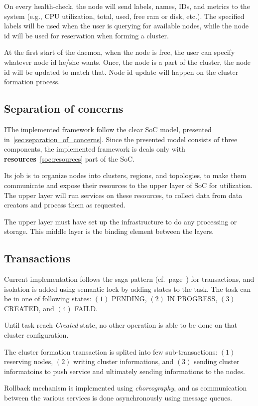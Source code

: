 On every health-check, the node will send labels, names, IDs, and metrics to the system (e.g., CPU utilization, total, used, free ram or disk, etc.). The specified labels will be used when the user is querying for available nodes, while the node id will be used for reservation when forming a cluster.

At the first start of the daemon, when the node is free, the user can specify whatever node id he/she wants. Once, the node is a part of the cluster, the node id will be updated to match that. Node id update will happen on the cluster formation process.
%
%
\subsection{Separation of concerns}\label{sec:framework_SoC}
%
IThe implemented framework follow the clear SoC model, presented in~\ref{sec:separation_of_concerns}. Since the presented model consists of three components, the implemented framework is deals only with \textbf{resources}~\ref{soc:resources} part of the SoC. 

Its job is to organize nodes into clusters, regions, and topologies, to make them communicate and expose their resources to the upper layer of SoC for utilization. The upper layer will run services on these resources, to collect data from data creators and process them as requested.

The upper layer must have set up the infrastructure to do any processing or storage. This middle layer is the binding element between the layers.
%
%
\subsection{Transactions}\label{sec:transaction}
%
Current implementation follows the saga pattern (cf.~page~\pageref{sec:sagas}) for transactions, and isolation is added using semantic lock by adding states to the task. The task can be in one of following states: $(1)$ PENDING, $(2)$ IN PROGRESS, $(3)$ CREATED, and $(4)$ FAILD. 

Until task reach \emph{Created} state, no other operation is able to be done on that cluster configuration.

The cluster formation transaction is splited into few sub-transactions: $(1)$ reserving nodes, $(2)$ writing cluster informations, and $(3)$ sending cluster informatoins to push service and ultimately sending informations to the nodes. 

Rollback mechanism is implemented using \emph{choreography}, and as communication between the various services is done asynchronously using message queues.
%
%
